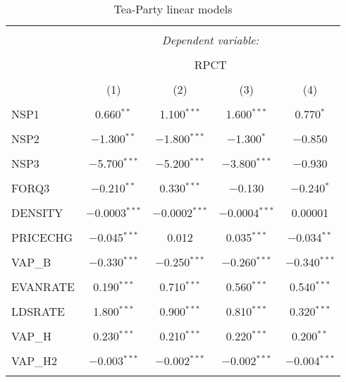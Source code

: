 \documentclass[
]{article}
\begin{document}
\begin{table}[!htbp] \centering
  \caption{Tea-Party linear models}
  \label{tab:justp}
\small
\begin{tabular}{@{\extracolsep{3pt}}lcccc}
\\[-1.8ex]\hline
\hline \\[-1.8ex]
 & \multicolumn{4}{c}{\textit{Dependent variable:}} \\
\cline{2-5}
\\[-1.8ex] & \multicolumn{4}{c}{RPCT} \\
\\[-1.8ex] & (1) & (2) & (3) & (4)\\
\hline \\[-1.8ex]
 NSP1 & 0.660$^{**}$ & 1.100$^{***}$ & 1.600$^{***}$ & 0.770$^{*}$ \\
  & & & & \\
 NSP2 & $-$1.300$^{**}$ & $-$1.800$^{***}$ & $-$1.300$^{*}$ & $-$0.850 \\
  & & & & \\
 NSP3 & $-$5.700$^{***}$ & $-$5.200$^{***}$ & $-$3.800$^{***}$ & $-$0.930 \\
  & & & & \\
 FORQ3 & $-$0.210$^{**}$ & 0.330$^{***}$ & $-$0.130 & $-$0.240$^{*}$ \\
  & & & & \\
 DENSITY & $-$0.0003$^{***}$ & $-$0.0002$^{***}$ & $-$0.0004$^{***}$ & 0.00001 \\
  & & & & \\
 PRICECHG & $-$0.045$^{***}$ & 0.012 & 0.035$^{***}$ & $-$0.034$^{**}$ \\
  & & & & \\
 VAP\_B & $-$0.330$^{***}$ & $-$0.250$^{***}$ & $-$0.260$^{***}$ & $-$0.340$^{***}$ \\
  & & & & \\
 EVANRATE & 0.190$^{***}$ & 0.710$^{***}$ & 0.560$^{***}$ & 0.540$^{***}$ \\
  & & & & \\
 LDSRATE & 1.800$^{***}$ & 0.900$^{***}$ & 0.810$^{***}$ & 0.320$^{***}$ \\
  & & & & \\
 VAP\_H & 0.230$^{***}$ & 0.210$^{***}$ & 0.220$^{***}$ & 0.200$^{**}$ \\
  & & & & \\
 VAP\_H2 & $-$0.003$^{***}$ & $-$0.002$^{***}$ & $-$0.002$^{***}$ & $-$0.004$^{***}$ \\
  & & & & \\

\end{tabular}
\end{table}
\end{document}
